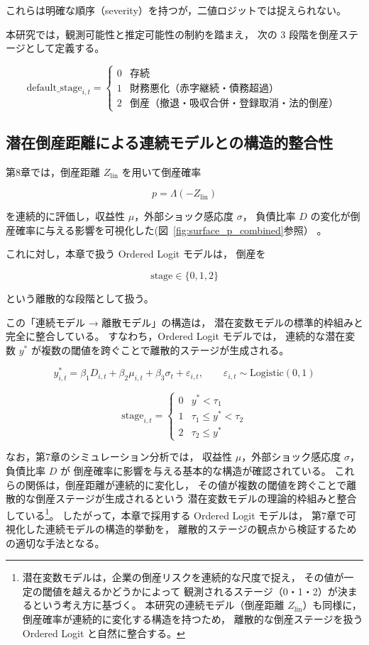 これらは明確な順序（severity）を持つが，二値ロジットでは捉えられない。

本研究では，観測可能性と推定可能性の制約を踏まえ，
次の 3 段階を倒産ステージとして定義する。



\[
\text{default\_stage}_{i,t} =
\begin{cases}
0 & \text{存続} \\
1 & \text{財務悪化（赤字継続・債務超過）} \\
2 & \text{倒産（撤退・吸収合併・登録取消・法的倒産）}
\end{cases}
\]



\subsection*{潜在倒産距離による連続モデルとの構造的整合性}

第8章では，倒産距離 $Z_{\text{lin}}$ を用いて倒産確率


\[
p = \Lambda(-Z_{\text{lin}})
\]


を連続的に評価し，収益性 $\mu$，外部ショック感応度 $\sigma$，
負債比率 $D$ の変化が倒産確率に与える影響を可視化した(図~\ref{fig:surface_p_combined}参照）
。

これに対し，本章で扱う Ordered Logit モデルは，
倒産を


\[
\text{stage} \in \{0,1,2\}
\]


という離散的な段階として扱う。

この「連続モデル → 離散モデル」の構造は，
潜在変数モデルの標準的枠組みと完全に整合している。
すなわち，Ordered Logit モデルでは，
連続的な潜在変数 $y^*$ が複数の閾値を跨ぐことで離散的ステージが生成される。



\[
y^*_{i,t} =
\beta_1 D_{i,t}
+ \beta_2 \mu_{i,t}
+ \beta_3 \sigma_t
+ \varepsilon_{i,t},
\qquad
\varepsilon_{i,t} \sim \text{Logistic}(0,1)
\]





\[
\text{stage}_{i,t} =
\begin{cases}
0 & y^* < \tau_1 \\
1 & \tau_1 \le y^* < \tau_2 \\
2 & \tau_2 \le y^*
\end{cases}
\]


なお，第7章のシミュレーション分析では，
収益性 $\mu$，外部ショック感応度 $\sigma$，負債比率 $D$ が
倒産確率に影響を与える基本的な構造が確認されている。
これらの関係は，倒産距離が連続的に変化し，
その値が複数の閾値を跨ぐことで離散的な倒産ステージが生成されるという
潜在変数モデルの理論的枠組みと整合している\footnote{
潜在変数モデルは，企業の倒産リスクを連続的な尺度で捉え，
その値が一定の閾値を越えるかどうかによって
観測されるステージ（0・1・2）が決まるという考え方に基づく。
本研究の連続モデル（倒産距離 $Z_{\text{lin}}$）も同様に，
倒産確率が連続的に変化する構造を持つため，
離散的な倒産ステージを扱う Ordered Logit と自然に整合する。
}。
したがって，本章で採用する Ordered Logit モデルは，
第7章で可視化した連続モデルの構造的挙動を，
離散的ステージの観点から検証するための適切な手法となる。


